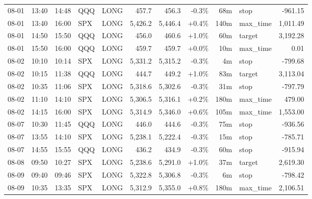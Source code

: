 \documentclass[11pt,a4paper,twoside]{article}
\begin{document}
\begin{center}
\begin{longtable}{>{\color{txtmain}}l l l l l r r r r >{\color{txtmain}}l r}
08-01 & 13:40 & 14:48 & QQQ & LONG & 457.7 & 456.3 & \textcolor{lossred}{-0.3\%} & 68m & stop & \textcolor{lossred}{-961.15} \\
08-01 & 13:40 & 16:00 & SPX & LONG & 5,426.2 & 5,446.4 & \textcolor{wingreen}{+0.4\%} & 140m & max\_time & \textcolor{wingreen}{1,011.49} \\
08-01 & 14:50 & 15:50 & QQQ & LONG & 456.0 & 460.6 & \textcolor{wingreen}{+1.0\%} & 60m & target & \textcolor{wingreen}{3,192.28} \\
08-01 & 15:50 & 16:00 & QQQ & LONG & 459.7 & 459.7 & \textcolor{wingreen}{+0.0\%} & 10m & max\_time & \textcolor{wingreen}{0.01} \\
08-02 & 10:10 & 10:14 & SPX & LONG & 5,331.2 & 5,315.2 & \textcolor{lossred}{-0.3\%} & 4m & stop & \textcolor{lossred}{-799.68} \\
08-02 & 10:15 & 11:38 & QQQ & LONG & 444.7 & 449.2 & \textcolor{wingreen}{+1.0\%} & 83m & target & \textcolor{wingreen}{3,113.04} \\
08-02 & 10:35 & 11:06 & SPX & LONG & 5,318.6 & 5,302.6 & \textcolor{lossred}{-0.3\%} & 31m & stop & \textcolor{lossred}{-797.79} \\
08-02 & 11:10 & 14:10 & SPX & LONG & 5,306.5 & 5,316.1 & \textcolor{wingreen}{+0.2\%} & 180m & max\_time & \textcolor{wingreen}{479.00} \\
08-02 & 14:15 & 16:00 & SPX & LONG & 5,314.9 & 5,346.0 & \textcolor{wingreen}{+0.6\%} & 105m & max\_time & \textcolor{wingreen}{1,553.00} \\
08-07 & 10:30 & 11:45 & QQQ & LONG & 446.0 & 444.6 & \textcolor{lossred}{-0.3\%} & 75m & stop & \textcolor{lossred}{-936.56} \\
08-07 & 13:55 & 14:10 & SPX & LONG & 5,238.1 & 5,222.4 & \textcolor{lossred}{-0.3\%} & 15m & stop & \textcolor{lossred}{-785.71} \\
08-07 & 14:55 & 15:55 & QQQ & LONG & 436.2 & 434.9 & \textcolor{lossred}{-0.3\%} & 60m & stop & \textcolor{lossred}{-915.94} \\
08-08 & 09:50 & 10:27 & SPX & LONG & 5,238.6 & 5,291.0 & \textcolor{wingreen}{+1.0\%} & 37m & target & \textcolor{wingreen}{2,619.30} \\
08-09 & 09:40 & 09:46 & SPX & LONG & 5,322.8 & 5,306.8 & \textcolor{lossred}{-0.3\%} & 6m & stop & \textcolor{lossred}{-798.42} \\
08-09 & 10:35 & 13:35 & SPX & LONG & 5,312.9 & 5,355.0 & \textcolor{wingreen}{+0.8\%} & 180m & max\_time & \textcolor{wingreen}{2,106.51} \\

\end{longtable}
\end{center}
\end{document}
